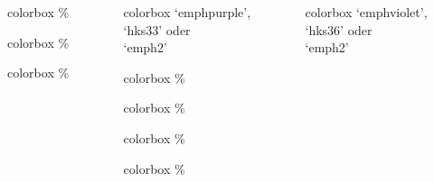 \documentclass[german,notoc]{tudbeamer}%
\begin{document}
\begin{frame}
\begin{columns}[T,onlytextwidth]
\begin{column}{.19\textwidth}
\begin{beamercolorbox}[wd=0.9\textwidth,sep=1em]{colorbox}
				\%
		    \end{beamercolorbox}
			\begin{beamercolorbox}[wd=0.9\textwidth,sep=1em]{colorbox}
				\%
		    \end{beamercolorbox}
			\begin{beamercolorbox}[wd=0.9\textwidth,sep=1em]{colorbox}
				\%
		    \end{beamercolorbox}
		\end{column}
		\begin{column}{.19\textwidth}%
			\begin{beamercolorbox}[wd=0.9\textwidth,sep=1em]{colorbox}
				\centering `emphpurple',\\ `hks33' oder\\ `emph2'
		    \end{beamercolorbox}
			\begin{beamercolorbox}[wd=0.9\textwidth,sep=1em]{colorbox}
				\%
		    \end{beamercolorbox}
			\begin{beamercolorbox}[wd=0.9\textwidth,sep=1em]{colorbox}
				\%
		    \end{beamercolorbox}
			\begin{beamercolorbox}[wd=0.9\textwidth,sep=1em]{colorbox}
				\%
		    \end{beamercolorbox}
			\begin{beamercolorbox}[wd=0.9\textwidth,sep=1em]{colorbox}
				\%
		    \end{beamercolorbox}
		\end{column}
		\begin{column}{.19\textwidth}%
			\begin{beamercolorbox}[wd=0.9\textwidth,sep=1em]{colorbox}
				\centering `emphviolet',\\ `hks36' oder\\ `emph2'
		    \end{beamercolorbox}

\end{column}
\end{columns}
\end{frame}
\end{document}
